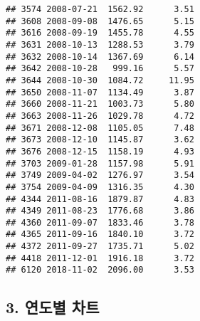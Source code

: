 \documentclass[]{article}
\begin{document}
\begin{verbatim}
## 3574 2008-07-21  1562.92      3.51
## 3608 2008-09-08  1476.65      5.15
## 3616 2008-09-19  1455.78      4.55
## 3631 2008-10-13  1288.53      3.79
## 3632 2008-10-14  1367.69      6.14
## 3642 2008-10-28   999.16      5.57
## 3644 2008-10-30  1084.72     11.95
## 3650 2008-11-07  1134.49      3.87
## 3660 2008-11-21  1003.73      5.80
## 3663 2008-11-26  1029.78      4.72
## 3671 2008-12-08  1105.05      7.48
## 3673 2008-12-10  1145.87      3.62
## 3676 2008-12-15  1158.19      4.93
## 3703 2009-01-28  1157.98      5.91
## 3749 2009-04-02  1276.97      3.54
## 3754 2009-04-09  1316.35      4.30
## 4344 2011-08-16  1879.87      4.83
## 4349 2011-08-23  1776.68      3.86
## 4360 2011-09-07  1833.46      3.78
## 4365 2011-09-16  1840.10      3.72
## 4372 2011-09-27  1735.71      5.02
## 4418 2011-12-01  1916.18      3.72
## 6120 2018-11-02  2096.00      3.53
\end{verbatim}

\subsection{3. 연도별 차트}\label{-}
\end{document}
